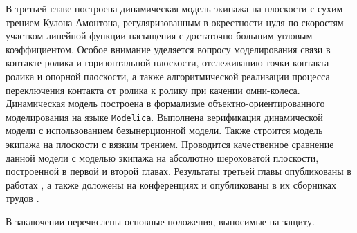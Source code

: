 В третьей главе построена динамическая модель экипажа на плоскости с сухим трением Кулона-Амонтона, регуляризованным в окрестности нуля по скоростям участком линейной функции насыщения с достаточно большим угловым коэффициентом. Особое внимание уделяется вопросу моделирования связи в контакте ролика и горизонтальной плоскости, отслеживанию точки контакта ролика и опорной плоскости, а также алгоритмической реализации процесса переключения контакта от ролика к ролику при качении омни-колеса. Динамическая модель построена в формализме объектно-ориентированного моделирования на языке \texttt{Modelica}. Выполнена верификация динамической модели с использованием безынерционной модели. Также строится модель экипажа на плоскости с вязким трением. Проводится качественное сравнение данной модели с моделью экипажа на абсолютно шероховатой плоскости, построенной в первой и второй главах. Результаты третьей главы опубликованы в работах \cite{KosenkoGerasimovNd2016,KosenkoGerasimovJsme2016}, а также доложены на конференциях и опубликованы в их сборниках трудов \cite{Kosenko2014unilateral,KosenkoGerasimov2014,Kosenko201construction,Kosenko2015verification,Kosenko2015hierarchy,KosenkoGerasimov2015,Kosenko2016testbench}.

В заключении перечислены основные положения, выносимые на защиту.



% 


